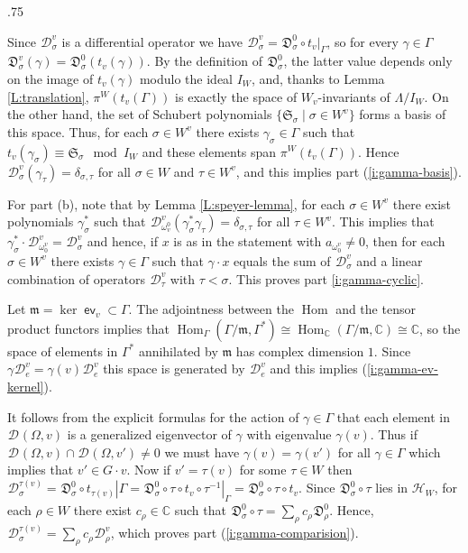 \documentclass[11pt,fleqn]{amsart}
\makeatletter
\renewcommand\proofname{Proof}
\renewenvironment{proof}[1][\textit{\proofname}]{\par
 \pushQED{\qed}%
 \normalfont \topsep.75\paraskip\relax
 \trivlist
 \item[\hskip\labelsep
 \itshape
 #1\@addpunct{.}]\ignorespaces
}{%
 \popQED\endtrivlist\@endpefalse
}
\newcounter{para}[section]
\newcommand\CC{\mathbb C}
\newcommand\D[3]{{}^{#1} \mathfrak D_{#2}^{#3}}
\newcommand\DD[3]{{}^{#1} \mathcal D_{#2}^{#3}}
\newcommand\m{\mathfrak m}
\renewcommand\SS{\mathfrak S}
\DeclareMathOperator\Hom{Hom}
\DeclareMathOperator\ev{\mathsf{ev}}
\makeatother
\begin{document}
\begin{proof}
Since $\DD{}{\sigma}{v}$ is a differential operator we have $\DD{}{\sigma}{v}
= \D{}{\sigma}{0} \circ t_v |_\Gamma$, so for every $\gamma \in \Gamma$
$\D{}{\sigma}{v}(\gamma) = \D{}{\sigma}{0}(t_v(\gamma))$. By the definition  of
 $\D{}{\sigma}{0}$, the latter value depends only on the image of 
$t_v(\gamma)$ modulo the ideal $I_W$, and, thanks to Lemma 
\ref{L:translation}, $\pi^W(t_v(\Gamma))$ is exactly the space of $W_v$-invariants of $\Lambda/I_W$. On the other hand, the set of Schubert polynomials $\{\SS_\sigma 
\mid \sigma \in W^v\}$ forms a basis of this space. Thus, for each $\sigma \in W^v$
there exists $\gamma_\sigma \in \Gamma$ such that $t_v(\gamma_\sigma) \equiv 
\SS_\sigma \mod I_W$ and these elements span $\pi^W(t_v(\Gamma))$. Hence
$\DD{}{\sigma}{v}(\gamma_\tau) = \delta_{\sigma,\tau}$ for all $\sigma \in W$
and $\tau \in W^v$, and this implies part (\ref{i:gamma-basis}).

For part (b), note that by Lemma \ref{L:speyer-lemma}, for each $\sigma \in W^v$ there exist
polynomials $\gamma_\sigma^*$ such that $\DD{}{\omega_v^0}{v}(\gamma_\sigma^*
\gamma_\tau) = \delta_{\sigma,\tau}$ for all $\tau \in W^v$. This implies that
$\gamma_\sigma^* \cdot \DD{}{\omega_0^v}{v} = \DD{}{\sigma}{v}$ and hence, 
if $x$ is as in the statement with $a_{\omega_0^v}
\neq 0$, then for each $\sigma \in W^v$ there exists $\gamma \in \Gamma$ such
that $\gamma \cdot x$ equals the sum of $\DD{}{\sigma}{v}$ and a linear combination of
operators $\DD{}{\tau}{v}$ with $\tau < \sigma$. This proves part 
\ref{i:gamma-cyclic}. 



Let $\m = \ker \ev_{v} \subset \Gamma$. The adjointness between the $\Hom$ and 
the tensor product functors implies that $\Hom_\Gamma(\Gamma / \m, \Gamma^*) \cong 
\Hom_\CC(\Gamma/\m, \CC) \cong \CC$, so the space of elements in $\Gamma^*$
annihilated by $\m$ has complex dimension $1$. Since $\gamma \DD{}{e}{v} = 
\gamma(v) \DD{}{e}{v}$ this space is generated by $\DD{}{e}{v}$ and this 
implies (\ref{i:gamma-ev-kernel}). 


It follows from the explicit formulas for the action of $\gamma \in \Gamma$ 
that each element in $\DD{}{}{}(\Omega, v)$ is a generalized eigenvector of 
$\gamma$ with eigenvalue $\gamma(v)$. Thus if $\DD{}{}{}(\Omega, v) \cap 
\DD{}{}{}(\Omega, v') \neq 0$ we must have $\gamma(v) = \gamma(v')$ for all
$\gamma \in \Gamma$ which implies that $v' \in G \cdot v$. Now if $v' = 
\tau(v)$ for some $\tau \in W$ then $\DD{}{\sigma}{\tau(v)} = \D{}{\sigma}{0}
\circ t_{\tau(v)}|\Gamma = \D{}{\sigma}{0} \circ \tau \circ t_v \circ \tau^{-1}
|_\Gamma = \D{}{\sigma}{0} \circ \tau \circ t_v$. Since $\D{}{\sigma}{0} 
\circ \tau$ lies in $\mathcal H_W$, for each $\rho
\in W$ there exist $c_\rho \in \CC$ such that $\D{}{\sigma}{0} \circ \tau = \sum_\rho c_\rho \D{}{\rho}{0}$. Hence, $\DD{}{\sigma}{\tau(v)} = \sum_\rho 
c_\rho \DD{}{\rho}{v}$, which proves part (\ref{i:gamma-comparision}).
\end{proof}
\end{document}
